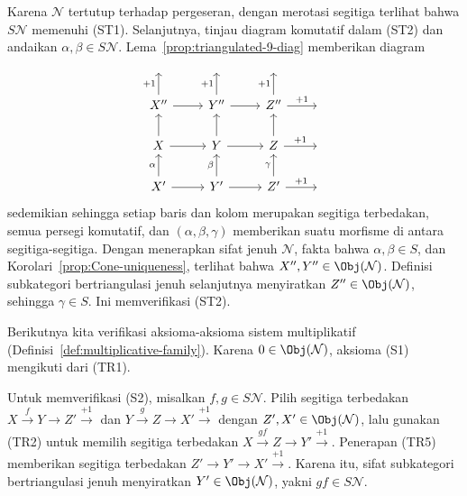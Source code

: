 \begin{bukti}
	Karena $\mathcal{N}$ tertutup terhadap pergeseran, dengan merotasi segitiga
	terlihat bahwa $S\mathcal{N}$ memenuhi (ST1). Selanjutnya, tinjau diagram
	komutatif dalam (ST2) dan andaikan $\alpha, \beta \in S\mathcal{N}$.
	Lema~\ref{prop:triangulated-9-diag} memberikan diagram
	\[\begin{tikzcd}
		{} & {} & {} & {} \\
		X'' \arrow[u, "+1"] \arrow[r] & Y'' \arrow[u, "+1"] \arrow[r] & Z'' \arrow[u, "+1"] \arrow[r, "+1"] & {} \\
		X \arrow[r] \arrow[u] & Y \arrow[r] \arrow[u] & Z \arrow[r, "+1"] \arrow[u] & {}\\
		X' \arrow[r] \arrow[u, "\alpha"] & Y' \arrow[r] \arrow[u, "\beta"] & Z' \arrow[r, "+1"] \arrow[u, "\gamma"] & {}
	\end{tikzcd}\]
	sedemikian sehingga setiap baris dan kolom merupakan segitiga terbedakan,
	semua persegi komutatif, dan $(\alpha, \beta, \gamma)$ memberikan suatu
	morfisme di antara segitiga-segitiga. Dengan menerapkan sifat jenuh
	$\mathcal{N}$, fakta bahwa $\alpha, \beta \in S$, dan
	Korolari~\ref{prop:Cone-uniqueness}, terlihat bahwa
	$X'', Y'' \in \Obj(\mathcal{N})$. Definisi subkategori bertriangulasi jenuh
	selanjutnya menyiratkan $Z'' \in \Obj(\mathcal{N})$, sehingga
	$\gamma \in S$. Ini memverifikasi (ST2).

	Berikutnya kita verifikasi aksioma-aksioma sistem multiplikatif
	(Definisi~\ref{def:multiplicative-family}). Karena
	$0 \in \Obj(\mathcal{N})$, aksioma (S1) mengikuti dari (TR1).

	Untuk memverifikasi (S2), misalkan $f, g \in S\mathcal{N}$. Pilih segitiga
	terbedakan $X \xrightarrow{f} Y \to Z' \xrightarrow{+1}$ dan
	$Y \xrightarrow{g} Z \to X' \xrightarrow{+1}$ dengan
	$Z', X' \in \Obj(\mathcal{N})$, lalu gunakan (TR2) untuk memilih segitiga
	terbedakan $X \xrightarrow{gf} Z \to Y' \xrightarrow{+1}$. Penerapan (TR5)
	memberikan segitiga terbedakan $Z' \to Y' \to X' \xrightarrow{+1}$.
	Karena itu, sifat subkategori bertriangulasi jenuh menyiratkan
	$Y' \in \Obj(\mathcal{N})$, yakni $gf \in S\mathcal{N}$.


\end{bukti}
